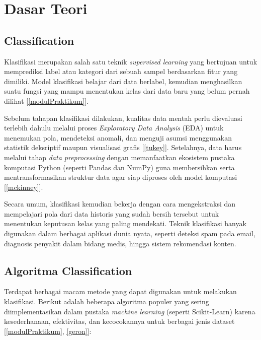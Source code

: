 \chapter{Dasar Teori}

\section{Classification}
Klasifikasi merupakan salah satu teknik \textit{supervised learning} yang bertujuan untuk memprediksi label atau kategori dari sebuah sampel berdasarkan fitur yang dimiliki. Model klasifikasi belajar dari data berlabel, kemudian menghasilkan suatu fungsi yang mampu menentukan kelas dari data baru yang belum pernah dilihat [\ref{modulPraktikum}]. 

Sebelum tahapan klasifikasi dilakukan, kualitas data mentah perlu dievaluasi terlebih dahulu melalui proses \textit{Exploratory Data Analysis} (EDA) untuk menemukan pola, mendeteksi anomali, dan menguji asumsi menggunakan statistik deksriptif maupun visualisasi grafis [\ref{tukey}]. Setelahnya, data harus melalui tahap \textit{data preprocessing} dengan memanfaatkan ekosistem pustaka komputasi Python (seperti Pandas dan NumPy) guna membersihkan serta mentransformasikan struktur data agar siap diproses oleh model komputasi [\ref{mckinney}].

Secara umum, klasifikasi kemudian bekerja dengan cara mengekstraksi dan mempelajari pola dari data historis yang sudah bersih tersebut untuk menentukan keputusan kelas yang paling mendekati. Teknik klasifikasi banyak digunakan dalam berbagai aplikasi dunia nyata, seperti deteksi spam pada email, diagnosis penyakit dalam bidang medis, hingga sistem rekomendasi konten.

\section{Algoritma Classification}
Terdapat berbagai macam metode yang dapat digunakan untuk melakukan klasifikasi. Berikut adalah beberapa algoritma populer yang sering diimplementasikan dalam pustaka \textit{machine learning} (seperti Scikit-Learn) karena kesederhanaan, efektivitas, dan kecocokannya untuk berbagai jenis dataset [\ref{modulPraktikum}, \ref{geron}]:

